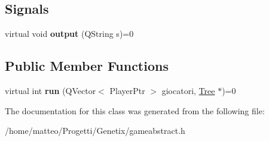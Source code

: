 \subsection*{Signals}
\begin{DoxyCompactItemize}
\item 
\mbox{\label{classGameAbstract_a00656373d219cc80af1ac277f270da42}} 
virtual void {\bfseries output} (Q\+String s)=0
\end{DoxyCompactItemize}
\subsection*{Public Member Functions}
\begin{DoxyCompactItemize}
\item 
\mbox{\label{classGameAbstract_a49ee89bfa47fff6eb177130d0521ab43}} 
virtual int {\bfseries run} (Q\+Vector$<$ Player\+Ptr $>$ giocatori, \hyperlink{classTree}{Tree} $\ast$)=0
\end{DoxyCompactItemize}


The documentation for this class was generated from the following file\+:\begin{DoxyCompactItemize}
\item 
/home/matteo/\+Progetti/\+Genetix/gameabstract.\+h\end{DoxyCompactItemize}
